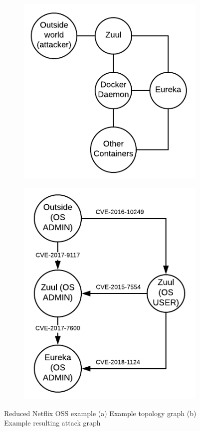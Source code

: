 \begin{figure}[!h]
	\centering
	\begin{subfigure}[b]{\columnwidth}
		\centering
		\includegraphics[width=.5\linewidth]{./images/Topology_graph}
		\caption{}
		\label{TopologyGraph}
	\end{subfigure}
	\hfill
	\begin{subfigure}[b]{\columnwidth}
		\centering
		\includegraphics[width=.5\linewidth]{./images/Attack_graph}
		\caption{}
		\label{AttackGraph}
	\end{subfigure}
	
	\caption[Two numerical solutions]{Reduced Netflix OSS example (a) Example topology graph  (b) Example resulting attack graph}
\end{figure}


